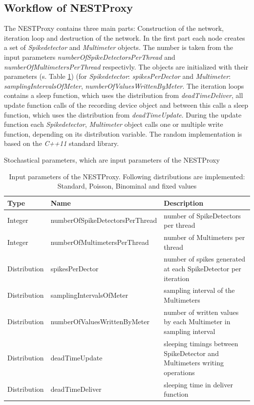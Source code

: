 \documentclass[]{YIC2015}
\begin{document}
\subsection{Workflow of NESTProxy}
The NESTProxy contains three main parts: Construction of the network,
iteration loop and destruction of the network.
In the first part each node creates a set of \emph{Spikedetector} and \emph{Multimeter} objects.
The number is taken from the input parameters \emph{numberOfSpikeDetectorsPerThread} and \emph{numberOfMultimetersPerThread} respectivly.
The objects are initialized with their parameters (s. Table \ref{tab:table-silva1})
(for \emph{Spikedetector}: \emph{spikesPerDector} and \emph{Multimeter}: \emph{samplingIntervalsOfMeter}, \emph{numberOfValuesWrittenByMeter}.
The iteration loops contains a sleep function, which uses the distribution from \emph{deadTimeDeliver},
all update function calls of the recording device object and between this calls
a sleep function, which uses the distribution from \emph{deadTimeUpdate}.
During the update function each \emph{Spikedetector}, \emph{Multimeter} object calls one or multiple write function, depending on its distribution variable.
The random implementation is based on the \emph{C++11} standard library.
\begin{table}[htdp]
\caption{Stochastical parameters, which are input parameters of the NESTProxy}
\centering
\begin{tabular}{lll}
\hline\hline
\textbf{Type} & \textbf{Name} & \textbf{Description} \\ \hline
Integer &   numberOfSpikeDetectorsPerThread & number of SpikeDetectors per thread  \\
Integer &   numberOfMultimetersPerThread & number of Multimeters per thread  \\
Distribution &   spikesPerDector & number of spikes generated at each SpikeDetector per iteration  \\
Distribution &   samplingIntervalsOfMeter & sampling interval of the Multimeters  \\
Distribution &   numberOfValuesWrittenByMeter & number of written values by each Multimeter in sampling interval  \\
Distribution  &  deadTimeUpdate & sleeping timings between SpikeDetector and Multimeters writing operations \\
Distribution &   deadTimeDeliver & sleeping time in deliver function  \\
\hline\hline
\end{tabular}
\label{tab:table-silva1}
\caption{Input parameters of the NESTProxy. Following distributions
are implemented: Standard, Poisson, Binominal and fixed values}
\end{table}
\end{document}
